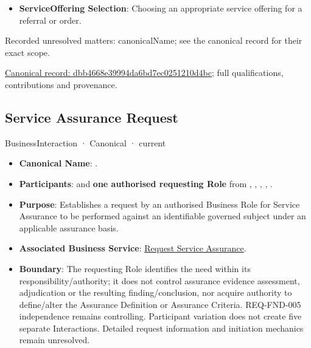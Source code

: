 \begin{itemize}


\item \textbf{ServiceOffering Selection}: Choosing an appropriate service offering for a referral or order.

\end{itemize}

{\small Recorded unresolved matters: canonicalName; see the canonical record for their exact scope.}\par
{\footnotesize \href{../../../../continuum/business/business-interaction/dbb4668e39994da6bd7ec0251210d4bc.md}{Canonical record: dbb4668e39994da6bd7ec0251210d4bc}; full qualifications, contributions and provenance.}\par
\subsection{Service Assurance Request}

\label{element:dd80af764f88480ea8b8b5898bb15ce7}
{\small BusinessInteraction · Canonical · current}\par

\begin{itemize}


\item \textbf{Canonical Name}: \texttt{}.

\item \textbf{Participants}: \texttt{} and \textbf{one authorised requesting Role} from \texttt{}, \texttt{}, \texttt{}, \texttt{}, \texttt{}.

\item \textbf{Purpose}: Establishes a request by an authorised Business Role for Service Assurance to be performed against an identifiable governed subject under an applicable assurance basis.

\item \textbf{Associated Business Service}: \href{\detokenize{../../../../../docs/markdown/03-business-architecture/behaviours/health-service-assurance.md#request-service-assurance}}{Request Service Assurance}.

\item \textbf{Boundary}: The requesting Role identifies the need within its responsibility/authority; it does not control assurance evidence assessment, adjudication or the resulting finding/conclusion, nor acquire authority to define/alter the Assurance Definition or Assurance Criteria. REQ-FND-005 independence remains controlling. Participant variation does not create five separate Interactions. Detailed request information and initiation mechanics remain unresolved.

\end{itemize}

